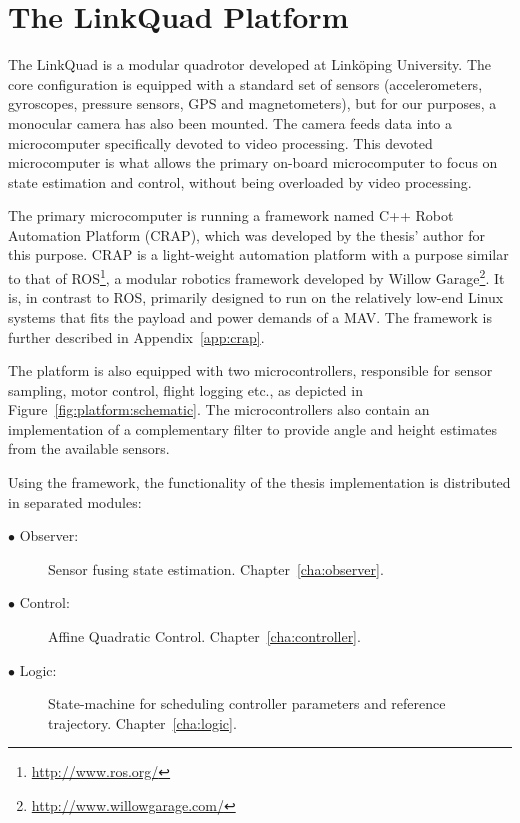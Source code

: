 \section{The LinkQuad Platform}
    The LinkQuad is a modular quadrotor developed at Linköping University.
    The core configuration is equipped with a standard set of sensors
    (accelerometers, gyroscopes, pressure sensors, GPS and magnetometers),
    but for our purposes, a monocular camera has also been mounted.
    The camera feeds data into a microcomputer specifically devoted to video processing.
    This devoted microcomputer is what allows the primary on-board microcomputer
    to focus on state estimation and control, without being overloaded by
    video processing.

    The primary microcomputer is running a framework named C++ Robot Automation Platform (CRAP),
    which was developed by the thesis' author for this purpose. CRAP is a light-weight
    automation platform with a purpose similar to that of ROS\footnote{\url{http://www.ros.org/}}, a
    modular robotics framework developed by Willow Garage\footnote{\url{http://www.willowgarage.com/}}.
    It is, in contrast to ROS, primarily designed to run on the relatively low-end Linux systems
    that fits the payload and power demands of a MAV. The framework is further
    described in Appendix~\ref{app:crap}.

    The platform is also equipped with two microcontrollers, responsible
    for sensor sampling, motor control, flight logging etc., as depicted in
    Figure~\ref{fig:platform:schematic}. The microcontrollers also contain
    an implementation of a complementary filter to provide angle and
    height estimates from the available sensors.

    Using the \crap framework, the functionality of the thesis implementation is
    distributed in separated modules:
    \begin{description}
        \item[$\bullet$ Observer:] Sensor fusing state estimation. Chapter~\ref{cha:observer}.
        \item[$\bullet$ Control:]  Affine Quadratic Control. Chapter~\ref{cha:controller}.
        \item[$\bullet$ Logic:]    State-machine for scheduling controller parameters and reference trajectory. Chapter~\ref{cha:logic}.
    \end{description}


